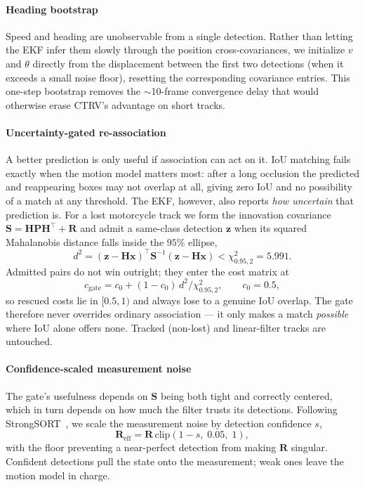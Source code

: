 \paragraph{Heading bootstrap}
Speed and heading are unobservable from a single detection.
Rather than letting the EKF infer them slowly through the position
cross-covariances, we initialize $v$ and $\theta$ directly from the
displacement between the first two detections (when it exceeds a small
noise floor), resetting the corresponding covariance entries.
This one-step bootstrap removes the $\sim$10-frame convergence delay
that would otherwise erase CTRV's advantage on short tracks.

\paragraph{Uncertainty-gated re-association}
A better prediction is only useful if association can act on it.
IoU matching fails exactly when the motion model matters most: after a
long occlusion the predicted and reappearing boxes may not overlap at
all, giving zero IoU and no possibility of a match at any threshold.
The EKF, however, also reports \emph{how uncertain} that prediction is.
For a lost motorcycle track we form the innovation covariance
$\mathbf{S} = \mathbf{H}\mathbf{P}\mathbf{H}^\top + \mathbf{R}$ and
admit a same-class detection $\mathbf{z}$ when its squared Mahalanobis
distance falls inside the $95\%$ ellipse,
\begin{equation}
  d^2 = (\mathbf{z} - \mathbf{H}\mathbf{x})^\top \mathbf{S}^{-1}
        (\mathbf{z} - \mathbf{H}\mathbf{x}) < \chi^2_{0.95,2} = 5.991 .
  \label{eq:gate}
\end{equation}
Admitted pairs do not win outright; they enter the cost matrix at
\begin{equation}
  c_{\mathrm{gate}} = c_0 + (1 - c_0)\, d^2 / \chi^2_{0.95,2},
  \qquad c_0 = 0.5,
  \label{eq:gate_cost}
\end{equation}
so rescued costs lie in $[0.5, 1)$ and always lose to a genuine IoU
overlap.
The gate therefore never overrides ordinary association --- it only
makes a match \emph{possible} where IoU alone offers none.
Tracked (non-lost) and linear-filter tracks are untouched.

\paragraph{Confidence-scaled measurement noise}
The gate's usefulness depends on $\mathbf{S}$ being both tight and
correctly centered, which in turn depends on how much the filter trusts
its detections.
Following StrongSORT~\cite{Du2023_strongsort}, we scale the measurement
noise by detection confidence $s$,
\begin{equation}
  \mathbf{R}_{\mathrm{eff}} = \mathbf{R}\,
    \mathrm{clip}(1 - s,\; 0.05,\; 1),
  \label{eq:nsa}
\end{equation}
with the floor preventing a near-perfect detection from making
$\mathbf{R}$ singular.
Confident detections pull the state onto the measurement; weak ones
leave the motion model in charge.

